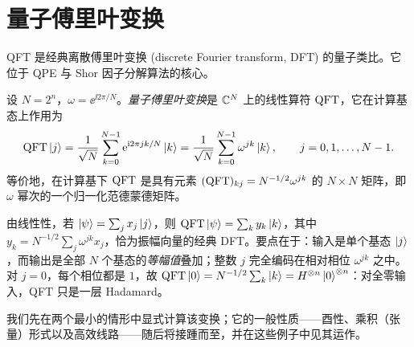 \section{量子傅里叶变换}
\label{sec:lec04-2}

QFT 是经典离散傅里叶变换 (discrete Fourier transform, DFT) 的量子类比。它位于 QPE 与 Shor 因子分解算法的核心。

\begin{definition}[量子傅里叶变换]
\label{def:lec04-qft}
设 $N=2^{n}$，$\omega=\ee^{\ii 2\pi/N}$。\emph{量子傅里叶变换}是 $\mathbb{C}^{N}$ 上的线性算符 $\mathrm{QFT}$，它在计算基态上作用为
\[
  \mathrm{QFT}\ket{j}=\frac{1}{\sqrt N}\sum_{k=0}^{N-1}\mathrm{e}^{\mathrm{i} 2\pi jk/N}\ket{k}
             =\frac{1}{\sqrt N}\sum_{k=0}^{N-1}\omega^{jk}\ket{k},
  \qquad j=0,1,\dots,N-1.
\]
等价地，在计算基下 $\mathrm{QFT}$ 是具有元素 $(\mathrm{QFT})_{kj}=N^{-1/2}\omega^{jk}$ 的 $N\times N$ 矩阵，即 $\omega$ 幂次的一个归一化范德蒙德矩阵。
\end{definition}

由线性性，若 $\ket{\psi}=\sum_j x_j\ket{j}$，则 $\mathrm{QFT}\ket{\psi}=\sum_k
y_k\ket{k}$，其中 $y_k=N^{-1/2}\sum_j\omega^{jk}x_j$，恰为振幅向量的经典 DFT。要点在于：输入是单个基态 $\ket{j}$，而输出是全部 $N$ 个基态的\emph{等幅值}叠加；整数 $j$ 完全编码在相对相位 $\omega^{jk}$ 之中。对 $j=0$，每个相位都是 $1$，故 $\mathrm{QFT}\ket{0}=N^{-1/2}\sum_k\ket{k}
=H^{\otimes n}\ket{0}^{\otimes n}$：对全零输入，QFT 只是一层 Hadamard。


我们先在两个最小的情形中显式计算该变换；它的一般性质——酉性、乘积（张量）形式以及高效线路——随后将接踵而至，并在这些例子中见其运作。

